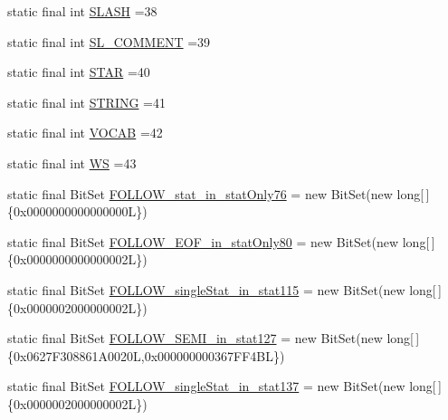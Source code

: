 \begin{DoxyCompactItemize}
\item 
static final int \hyperlink{classorg_1_1tzi_1_1use_1_1parser_1_1soil_1_1_soil_parser_af17a2636b6554adaa9ad6a479a0355bc}{S\-L\-A\-S\-H} =38
\item 
static final int \hyperlink{classorg_1_1tzi_1_1use_1_1parser_1_1soil_1_1_soil_parser_a28681cac93a48009fbbe4e835cb728e0}{S\-L\-\_\-\-C\-O\-M\-M\-E\-N\-T} =39
\item 
static final int \hyperlink{classorg_1_1tzi_1_1use_1_1parser_1_1soil_1_1_soil_parser_a4bebb8f71fc88077fa077dec646d38ef}{S\-T\-A\-R} =40
\item 
static final int \hyperlink{classorg_1_1tzi_1_1use_1_1parser_1_1soil_1_1_soil_parser_ac9099ceb3e0b4b4be0d899517cdb9c1a}{S\-T\-R\-I\-N\-G} =41
\item 
static final int \hyperlink{classorg_1_1tzi_1_1use_1_1parser_1_1soil_1_1_soil_parser_a4085cffd94104a089eb27e0a14428cf2}{V\-O\-C\-A\-B} =42
\item 
static final int \hyperlink{classorg_1_1tzi_1_1use_1_1parser_1_1soil_1_1_soil_parser_a34f858d8d0f2178fb48c8b77e77db824}{W\-S} =43
\item 
static final Bit\-Set \hyperlink{classorg_1_1tzi_1_1use_1_1parser_1_1soil_1_1_soil_parser_ac84c75ccce4252f51987cf92066773b3}{F\-O\-L\-L\-O\-W\-\_\-stat\-\_\-in\-\_\-stat\-Only76} = new Bit\-Set(new long\mbox{[}$\,$\mbox{]}\{0x0000000000000000\-L\})
\item 
static final Bit\-Set \hyperlink{classorg_1_1tzi_1_1use_1_1parser_1_1soil_1_1_soil_parser_ab4bbd3466f76e7d5736ade77879ac652}{F\-O\-L\-L\-O\-W\-\_\-\-E\-O\-F\-\_\-in\-\_\-stat\-Only80} = new Bit\-Set(new long\mbox{[}$\,$\mbox{]}\{0x0000000000000002\-L\})
\item 
static final Bit\-Set \hyperlink{classorg_1_1tzi_1_1use_1_1parser_1_1soil_1_1_soil_parser_a740005f80afee8a581c6fbda484f5d81}{F\-O\-L\-L\-O\-W\-\_\-single\-Stat\-\_\-in\-\_\-stat115} = new Bit\-Set(new long\mbox{[}$\,$\mbox{]}\{0x0000002000000002\-L\})
\item 
static final Bit\-Set \hyperlink{classorg_1_1tzi_1_1use_1_1parser_1_1soil_1_1_soil_parser_a5c4b5e57b29a1ad76bb4429ff0ac0935}{F\-O\-L\-L\-O\-W\-\_\-\-S\-E\-M\-I\-\_\-in\-\_\-stat127} = new Bit\-Set(new long\mbox{[}$\,$\mbox{]}\{0x0627\-F308861\-A0020\-L,0x000000000367\-F\-F4\-B\-L\})
\item 
static final Bit\-Set \hyperlink{classorg_1_1tzi_1_1use_1_1parser_1_1soil_1_1_soil_parser_acf8f7af481c0bb74ea7efb51bb9ad49f}{F\-O\-L\-L\-O\-W\-\_\-single\-Stat\-\_\-in\-\_\-stat137} = new Bit\-Set(new long\mbox{[}$\,$\mbox{]}\{0x0000002000000002\-L\})

\end{DoxyCompactItemize}
